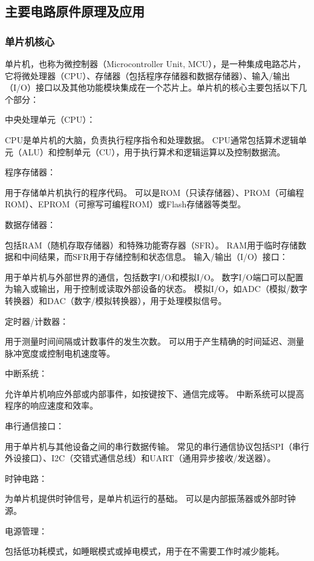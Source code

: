 \documentclass{textreportclass}  %
\begin{document}
	\subsection{主要电路原件原理及应用}		   %
	
	
		\subsubsection{单片机核心}			      %
		单片机，也称为微控制器（Microcontroller Unit, MCU），是一种集成电路芯片，它将微处理器（CPU）、存储器（包括程序存储器和数据存储器）、输入/输出（I/O）接口以及其他功能模块集成在一个芯片上。单片机的核心主要包括以下几个部分：
		
		中央处理单元（CPU）：
		
		CPU是单片机的大脑，负责执行程序指令和处理数据。
		CPU通常包括算术逻辑单元（ALU）和控制单元（CU），用于执行算术和逻辑运算以及控制数据流。
		
		程序存储器：
		
		用于存储单片机执行的程序代码。
		可以是ROM（只读存储器）、PROM（可编程ROM）、EPROM（可擦写可编程ROM）或Flash存储器等类型。
		
		数据存储器：
		
		包括RAM（随机存取存储器）和特殊功能寄存器（SFR）。
		RAM用于临时存储数据和中间结果，而SFR用于存储控制和状态信息。
		输入/输出（I/O）接口：
		
		用于单片机与外部世界的通信，包括数字I/O和模拟I/O。
		数字I/O端口可以配置为输入或输出，用于控制或读取外部设备的状态。
		模拟I/O，如ADC（模拟/数字转换器）和DAC（数字/模拟转换器），用于处理模拟信号。
		
		定时器/计数器：
		
		用于测量时间间隔或计数事件的发生次数。
		可以用于产生精确的时间延迟、测量脉冲宽度或控制电机速度等。
		
		中断系统：
		
		允许单片机响应外部或内部事件，如按键按下、通信完成等。
		中断系统可以提高程序的响应速度和效率。
		
		串行通信接口：
		
		用于单片机与其他设备之间的串行数据传输。
		常见的串行通信协议包括SPI（串行外设接口）、I2C（交错式通信总线）和UART（通用异步接收/发送器）。
		
		时钟电路：
		
		为单片机提供时钟信号，是单片机运行的基础。
		可以是内部振荡器或外部时钟源。
		
		电源管理：
		
		包括低功耗模式，如睡眠模式或掉电模式，用于在不需要工作时减少能耗。
		
\end{document}
